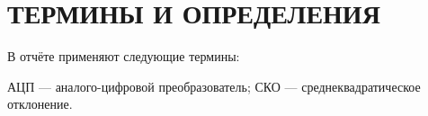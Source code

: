 \section*{ТЕРМИНЫ И ОПРЕДЕЛЕНИЯ}
В отчёте применяют следующие термины:

АЦП — аналого-цифровой преобразователь; %
СКО — среднеквадратическое отклонение. %
